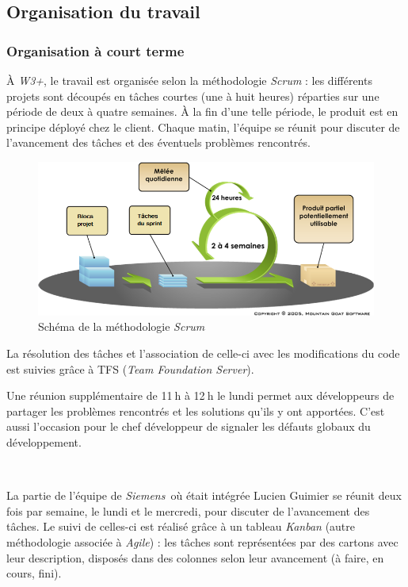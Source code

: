 \documentclass[a4paper, oneside, 12pt]{article}
\def\www{\emph{W3+}}
\def\siemens{\emph{Siemens}}
\begin{document}
\subsection{Organisation du travail}

\subsubsection{Organisation à court terme}

À \www, le travail est organisée selon la méthodologie \emph{Scrum} : les différents projets sont découpés en tâches courtes (une à huit heures) réparties sur une période de deux à quatre semaines. À la fin d’une telle période, le produit est en principe déployé chez le client. Chaque matin, l’équipe se réunit pour discuter de l’avancement des tâches et des éventuels problèmes rencontrés.

\begin{figure}[H]
	\centering
	\includegraphics[width=12cm]{img/scrum.png}
	\caption{Schéma de la méthodologie \emph{Scrum}}
\end{figure}

La résolution des tâches et l’association de celle-ci avec les modifications du code est suivies grâce à TFS (\emph{Team Foundation Server}).

Une réunion supplémentaire de 11$~$h à 12$~$h le lundi permet aux développeurs de partager les problèmes rencontrés et les solutions qu’ils y ont apportées. C’est aussi l’occasion pour le chef développeur de signaler les défauts globaux du développement.

\ 

La partie de l’équipe de \siemens\ où était intégrée Lucien {\sc Guimier} se réunit deux fois par semaine, le lundi et le mercredi, pour discuter de l’avancement des tâches. Le suivi de celles-ci est réalisé grâce à un tableau \emph{Kanban} (autre méthodologie associée à \emph{Agile}) : les tâches sont représentées par des cartons avec leur description, disposés dans des colonnes selon leur avancement (à faire, en cours, fini).
\end{document}
